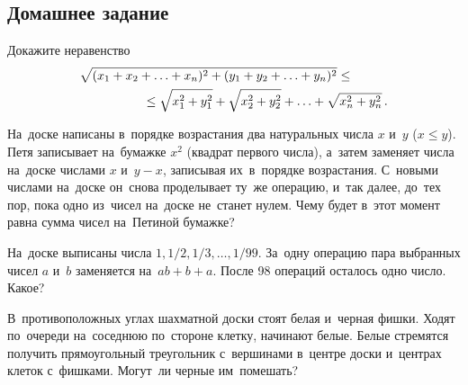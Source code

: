 

\subsection*{Домашнее задание}



\begin{problems}

\item
Докажите неравенство
\begin{align*}
    \hspace{5em}&\hspace{-5em}
    \sqrt{(x_1 + x_2 + \ldots + x_n)^2 + (y_1 + y_2 + \ldots + y_n)^2}
\leq\\&{}\leq
    \sqrt{x_1^2 + y_1^2} + \sqrt{x_2^2 + y_2^2}
    + \ldots +
    \sqrt{x_n^2 + y_n^2}
\,.\end{align*}

\item
На~доске написаны в~порядке возрастания два натуральных числа $x$ и~$y$
($x \leq y$).
Петя записывает на~бумажке $x^2$ (квадрат первого числа), а~затем заменяет
числа на~доске числами $x$ и~$y - x$, записывая их~в~порядке возрастания.
С~новыми числами на~доске он~снова проделывает ту~же операцию, и~так далее,
до~тех пор, пока одно из~чисел на~доске не~станет нулем.
Чему будет в~этот момент равна сумма чисел на~Петиной бумажке?

\item
На~доске выписаны числа $1, 1/2, 1/3, \ldots, 1/99$.
За~одну операцию пара выбранных чисел $a$ и~$b$ заменяется на~$a b + b + a$.
После 98 операций осталось одно число.
Какое?

\item
В~противоположных углах шахматной доски стоят белая и~черная фишки.
Ходят по~очереди на~соседнюю по~стороне клетку, начинают белые.
Белые стремятся получить прямоугольный треугольник с~вершинами в~центре доски
и~центрах клеток с~фишками.
Могут~ли черные им~помешать?

\end{problems}

